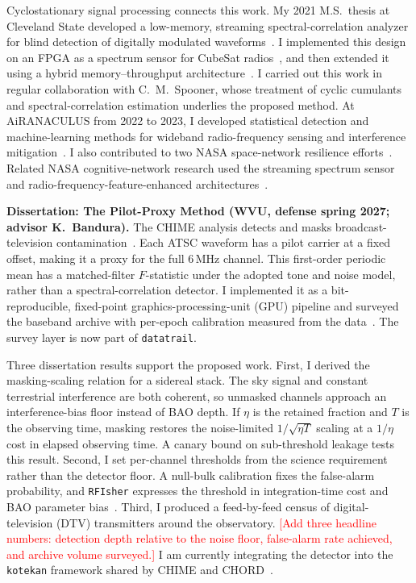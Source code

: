 \documentclass[12pt]{article}
\newcommand{\todo}[1]{\textcolor{red}{[#1]}}
\begin{document}
Cyclostationary signal processing connects this work. My 2021 M.S.\ thesis at Cleveland State developed a low-memory, streaming spectral-correlation analyzer for blind detection of digitally modulated waveforms~\cite[Abstract, p.~vii; Sec.~3.2, pp.~27--29]{gormley2021thesis}. I implemented this design on an FPGA as a spectrum sensor for CubeSat radios~\cite[Sec.~II; Figs.~7--9, p.~3; Sec.~III, Table~II, pp.~3--4]{gormley2021}, and then extended it using a hybrid memory--throughput architecture~\cite[pp.~34--36]{gormley2023}. I carried out this work in regular collaboration with C.~M.~Spooner, whose treatment of cyclic cumulants and spectral-correlation estimation underlies the proposed method. At AiRANACULUS from 2022 to 2023, I developed statistical detection and machine-learning methods for wideband radio-frequency sensing and interference mitigation~\cite[Sec.~IV, Figs.~5--6, pp.~3--4; Sec.~VI, Figs.~9 and 11, pp.~5--6]{mody2023a}. I also contributed to two NASA space-network resilience efforts~\cite[Secs.~III--V; Figs.~3--9, pp.~2--5]{mody2023b}. Related NASA cognitive-network research used the streaming spectrum sensor and radio-frequency-feature-enhanced architectures~\cite[Sec.~II.F, p.~272; Sec.~V, pp.~278--279]{dudukovich2022}.

\textbf{Dissertation: The Pilot-Proxy Method (WVU, defense spring 2027; advisor K.~Bandura).} The CHIME analysis detects and masks broadcast-television contamination~\cite[Sec.~3.1.2; Appendix~A.1, Eqs.~(A12)--(A15); Table~1]{chime2025auto}. Each ATSC waveform has a pilot carrier at a fixed offset, making it a proxy for the full 6\,MHz channel. This first-order periodic mean has a matched-filter $F$-statistic under the adopted tone and noise model, rather than a spectral-correlation detector. I implemented it as a bit-reproducible, fixed-point graphics-processing-unit (GPU) pipeline and surveyed the baseband archive with per-epoch calibration measured from the data~\cite{gormley2026a}. The survey layer is now part of \texttt{datatrail}.

Three dissertation results support the proposed work. First, I derived the masking-scaling relation for a sidereal stack. The sky signal and constant terrestrial interference are both coherent, so unmasked channels approach an interference-bias floor instead of BAO depth. If $\eta$ is the retained fraction and $T$ is the observing time, masking restores the noise-limited $1/\sqrt{\eta T}$ scaling at a $1/\eta$ cost in elapsed observing time. A canary bound on sub-threshold leakage tests this result. Second, I set per-channel thresholds from the science requirement rather than the detector floor. A null-bulk calibration fixes the false-alarm probability, and \texttt{RFIsher} expresses the threshold in integration-time cost and BAO parameter bias~\cite{gormley2026b}. Third, I produced a feed-by-feed census of digital-television (DTV) transmitters around the observatory. \todo{Add three headline numbers: detection depth relative to the noise floor, false-alarm rate achieved, and archive volume surveyed.} I am currently integrating the detector into the \texttt{kotekan} framework shared by CHIME and CHORD~\cite{gormley2026c}.
\end{document}
